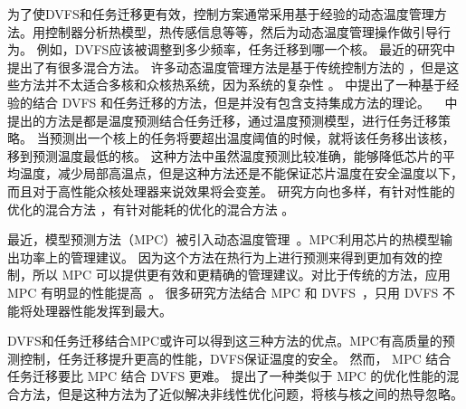  为了使DVFS和任务迁移更有效，控制方案通常采用基于经验的动态温度管理方法。用控制器分析热模型，热传感信息等等，然后为动态温度管理操作做引导行为。
 例如，DVFS应该被调整到多少频率，任务迁移到哪一个核。
 最近的研究中提出了有很多混合方法。
 许多动态温度管理方法是基于传统控制方法的 ，但是这些方法并不太适合多核和众核热系统，因为系统的复杂性 。 
 \cite{Brooks:HPCA'04}中提出了一种基于经验的结合 DVFS 和任务迁移的方法，但是并没有包含支持集成方法的理论。
 ~\cite{yeo2008predictive,coskun2008proactive} 中提出的方法是都是温度预测结合任务迁移，通过温度预测模型，进行任务迁移策略。
 当预测出一个核上的任务将要超出温度阈值的时候，就将该任务移出该核，移到预测温度最低的核。
 这种方法中虽然温度预测比较准确，能够降低芯片的平均温度，减少局部高温点，但是这种方法还是不能保证芯片温度在安全温度以下，而且对于高性能众核处理器来说效果将会变差。
 研究方向也多样，有针对性能的优化的混合方法 ，有针对能耗的优化的混合方法 。
 
 最近，模型预测方法（MPC）被引入动态温度管理~。MPC利用芯片的热模型输出功率上的管理建议。
 因为这个方法在热行为上进行预测来得到更加有效的控制，所以 MPC 可以提供更有效和更精确的管理建议。对比于传统的方法，应用 MPC 有明显的性能提高~。
 很多研究方法结合 MPC 和 DVFS~，只用 DVFS 不能将处理器性能发挥到最大。
 
 DVFS和任务迁移结合MPC或许可以得到这三种方法的优点。MPC有高质量的预测控制，任务迁移提升更高的性能，DVFS保证温度的安全。
 然而， MPC 结合任务迁移要比 MPC 结合 DVFS 更难。
 \cite{Hanumaiah:TCAD'11} 提出了一种类似于 MPC 的优化性能的混合方法，但是这种方法为了近似解决非线性优化问题，将核与核之间的热导忽略。
 
